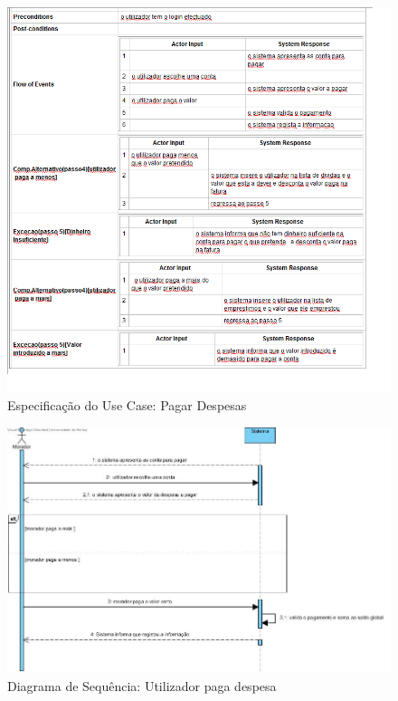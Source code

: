 \begin{figure}[htb!]
	\centering
	\includegraphics[scale=0.6]{imagens/Especificacoes/pagardespesas}  
	\caption{Especificação do Use Case: Pagar Despesas}  
\end{figure}


\begin{figure}[htb!]
	\centering
	\includegraphics[scale=0.5]{imagens/DiagramaSeq/PagarDespesa}  
	\caption{Diagrama de Sequência: Utilizador paga despesa}  
\end{figure}


